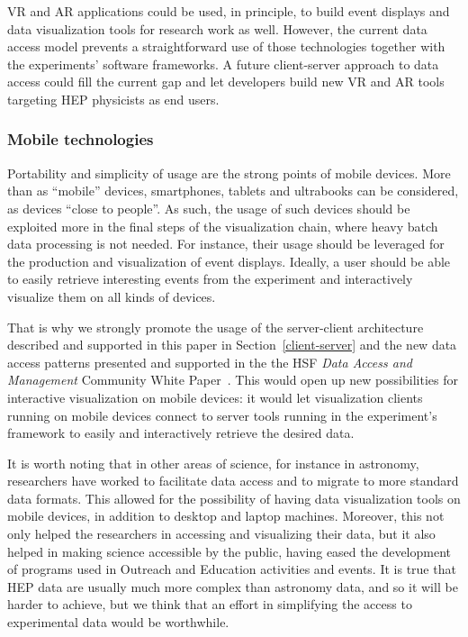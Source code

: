\documentclass[12pt,a4paper]{article}
\begin{document}
VR and AR applications could be used, in principle, to build event displays and data visualization tools for research work as well.
However, the current data access model prevents a straightforward use of those technologies together with the experiments' software frameworks.
A future client-server approach to data access could fill the current gap and let developers build new VR and AR tools targeting HEP physicists as end users.

\hypertarget{mobile-tech}{%
\subsubsection{Mobile technologies}\label{mobile-tech}}

Portability and simplicity of usage are the strong points of mobile devices. More than as ``mobile'' devices, smartphones,
tablets and ultrabooks can be considered, as devices ``close to people''. As such, the usage of such devices
should be exploited more in the final steps of the visualization chain, where heavy batch data processing is not needed. For instance,
their usage should be leveraged for the production and visualization of event displays.
Ideally, a user should be able to easily retrieve interesting events from the experiment and interactively visualize them on all
kinds of devices.

That is why we strongly promote the usage of the server-client architecture described and supported in this paper in Section~\ref{client-server}
and the new data access patterns presented and supported in the the HSF \textit{Data Access and Management} Community White Paper~\cite{HSF-CWP-2017-04}. %
This would open up new possibilities for interactive visualization on mobile devices: it would let visualization clients running on mobile devices
connect to server tools running in the experiment's framework to easily and interactively retrieve the desired data.

It is worth noting that in other areas of science, for instance in astronomy, researchers have worked to facilitate data
access and to migrate to more standard data formats. This allowed for the possibility of having data visualization tools
on mobile devices, in addition to desktop and laptop machines. Moreover, this not only helped the researchers in accessing and visualizing
their data, but it also helped in making science accessible by the public, having eased the development of programs used in
Outreach and Education activities and events. It is true that HEP data are usually much more complex than astronomy data, and so it
will be harder to achieve, but we think that an effort in simplifying the access to experimental data would be worthwhile.
\end{document}
